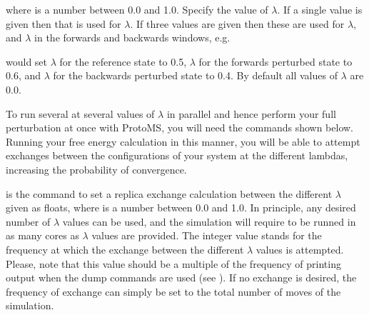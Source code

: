 \documentclass[letterpaper,10pt,english]{sphinxmanual}
\begin{document}
\ignorespaces 
\def\sphinxLiteralBlockLabel{\label{\detokenize{protoms:index-47}}}
%
\begin{sphinxVerbatim}[commandchars=\\\{\}]
 
\end{sphinxVerbatim}

where  is a number between 0.0 and 1.0. Specify the value of \(\lambda\). If a single value is given then that is used for \(\lambda\). If three values are given then these are used for \(\lambda\), and \(\lambda\) in the forwards and backwards windows, e.g.

%
\begin{sphinxVerbatim}[commandchars=\\\{\}]
   
\end{sphinxVerbatim}

would set \(\lambda\) for the reference state to 0.5, \(\lambda\) for the forwards perturbed state to 0.6, and \(\lambda\) for the backwards perturbed state to 0.4. By default all values of \(\lambda\) are 0.0.

To run several at several values of \(\lambda\)  in parallel and hence perform your full perturbation at once with ProtoMS, you will need the commands shown below. Running your free energy calculation in this manner, you will be able to attempt exchanges between the configurations of your system at the different lambdas, increasing the probability of convergence.

\ignorespaces 
\def\sphinxLiteralBlockLabel{\label{\detokenize{protoms:index-48}}}
%
\begin{sphinxVerbatim}[commandchars=\\\{\}]
    
\end{sphinxVerbatim}

is the command to set a replica exchange calculation between the different \(\lambda\) given as floats, where  is a number between 0.0 and 1.0. In principle, any desired number of \(\lambda\) values can be used, and the simulation will require to be runned in as many cores as \(\lambda\) values are provided. The integer value stands for the frequency at which the exchange between the different \(\lambda\) values is attempted. Please, note that this value should be a multiple of the frequency of printing output when the dump commands are used (see {\hyperref[\detokenize{protoms:frequent-output-generation}]{}}). If no exchange is desired, the frequency of exchange can simply be set to the total number of moves of the simulation.
\end{document}
